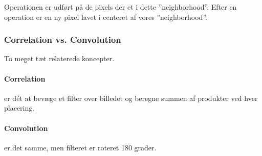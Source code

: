 Operationen er udført på de pixels der et i dette ''neighborhood''. Efter en operation er en ny pixel lavet i centeret af vores ''neighborhood''.

\subsubsection{Correlation vs. Convolution}
To meget tæt relaterede koncepter.

\paragraph{Correlation} er dét at bevæge et filter over billedet og beregne summen af produkter ved hver placering.

\paragraph{Convolution} er det samme, men filteret er roteret 180 grader.